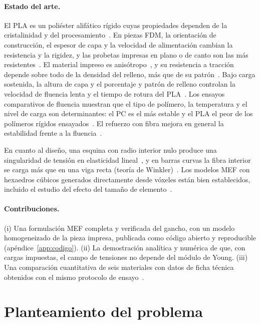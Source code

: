 \documentclass[11pt,a4paper]{article}
\begin{document}
\paragraph{Estado del arte.} El PLA es un poliéster alifático rígido cuyas propiedades dependen de la cristalinidad y del procesamiento~\cite{farah}. En piezas FDM, la orientación de construcción, el espesor de capa y la velocidad de alimentación cambian la resistencia y la rigidez, y las probetas impresas en plano o de canto son las más resistentes~\cite{chacon}. El material impreso es anisótropo~\cite{ahn}, y su resistencia a tracción depende sobre todo de la densidad del relleno, más que de su patrón~\cite{fernandez}. Bajo carga sostenida, la altura de capa y el porcentaje y patrón de relleno controlan la velocidad de fluencia lenta y el tiempo de rotura del PLA~\cite{waseem}. Los ensayos comparativos de fluencia muestran que el tipo de polímero, la temperatura y el nivel de carga son determinantes: el PC es el más estable y el PLA el peor de los polímeros rígidos ensayados~\cite{dogan}. El refuerzo con fibra mejora en general la estabilidad frente a la fluencia~\cite{hausler}.

En cuanto al diseño, una esquina con radio interior nulo produce una singularidad de tensión en elasticidad lineal~\cite{sinclair}, y en barras curvas la fibra interior se carga más que en una viga recta (teoría de Winkler)~\cite{shigley}. Los modelos MEF con hexaedros cúbicos generados directamente desde vóxeles están bien establecidos, incluido el estudio del efecto del tamaño de elemento~\cite{keyak1990,keyak1992}.

\paragraph{Contribuciones.} (i) Una formulación MEF completa y verificada del gancho, con un modelo homogeneizado de la pieza impresa, publicada como código abierto y reproducible (apéndice~\ref{app:codigo}). (ii) La demostración analítica y numérica de que, con cargas impuestas, el campo de tensiones no depende del módulo de Young. (iii) Una comparación cuantitativa de seis materiales con datos de ficha técnica obtenidos con el mismo protocolo de ensayo~\cite{bl-pla,bl-petg,bl-asa,bl-abs,bl-pc,bl-paht}.

\section{Planteamiento del problema}
\end{document}
